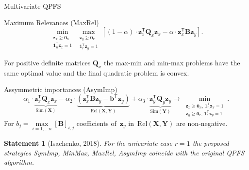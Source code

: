 \documentclass[9pt]{beamer}
\newcommand{\bz}{\mathbf{z}}
\newcommand{\bb}{\mathbf{b}}
\newcommand{\bY}{\mathbf{Y}}
\newcommand{\bX}{\mathbf{X}}
\newcommand{\bB}{\mathbf{B}}
\newcommand{\bQ}{\mathbf{Q}}
\newcommand{\bOne}{\boldsymbol{1}}
\newcommand{\bZero}{\boldsymbol{0}}
\newcommand{\T}{\mathsf{T}}
\newtheorem{statement}{Statement}
\begin{document}
\begin{frame}{Multivariate QPFS}
\begin{block}{Maximum Relevances (MaxRel)}
\[
\min_{\substack{\bz_x \geq \bZero_n \\ \bOne_n^{\T}\bz_x=1}} 	\max_{\substack{\bz_y \geq \bZero_r \\ \bOne_r^{\T}\bz_y=1}} \left[ (1 - \alpha) \cdot \bz_x^{\T} \bQ_x \bz_x - \alpha \cdot \bz_x^{\T} \bB \bz_y \right].
\]
\end{block}
\begin{theorem}[Isachenko, 2018]
	For positive definite matrices $\bQ_x$ the max-min and min-max problems have the same optimal value and the final quadratic problem is convex. 
\end{theorem}
\begin{block}{Assymmetric importances (AsymImp)}
\begin{equation*}
	\alpha_1 \cdot \underbrace{\bz_x^{\T} \bQ_x \bz_x}_{\text{Sim}(\bX)} - \alpha_2 \cdot  \underbrace{\left(\bz_x^{\T} \bB \bz_y - \bb^{\T} \bz_y \right) }_{\text{Rel}(\bX, \bY)} + \alpha_3 \cdot \underbrace{\bz_y^{\T} \bQ_y \bz_y}_{\text{Sim}(\bY)} \rightarrow \min_{\substack{\bz_x \geq \bZero_n, \, \bOne_n^{\T}\bz_x=1 \\ \bz_y \geq \bZero_r, \, \bOne_r^{\T}\bz_y=1}}.
\end{equation*}
For $b_j = \max\limits_{i=1, \dots n} [\bB]_{i, j}$ coefficients of~$\bz_y$ in~$\text{Rel}(\bX, \bY)$ are non-negative.

\begin{statement}[Isachenko, 2018]
	For the univariate case $r=1$ the proposed strategies SymImp, MinMax, MaxRel, AsymImp coincide with the original QPFS algorithm.
\end{statement}
\end{block}
\end{frame}
\end{document}
